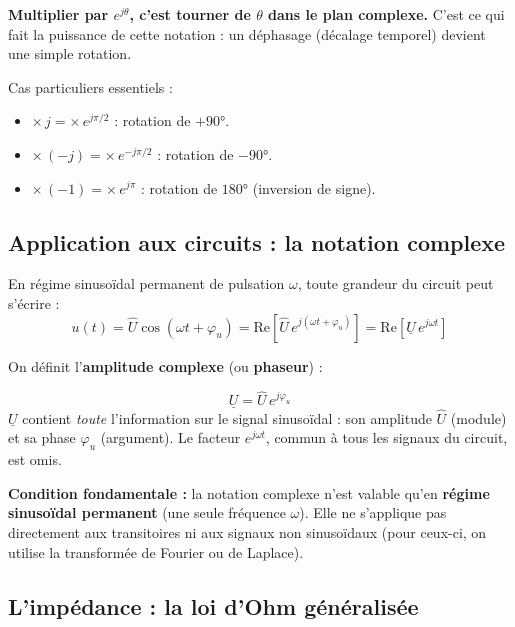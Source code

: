 \documentclass[12pt,a4paper,twoside]{book}
\begin{document}
\begin{intuition}
\textbf{Multiplier par $e^{j\theta}$, c'est tourner de $\theta$ dans le plan complexe.} C'est ce qui fait la puissance de cette notation : un déphasage (décalage temporel) devient une simple rotation.

Cas particuliers essentiels :
\begin{itemize}[nosep]
\item $\times\, j = \times\, e^{j\pi/2}$ : rotation de $+90°$.
\item $\times\, (-j) = \times\, e^{-j\pi/2}$ : rotation de $-90°$.
\item $\times\, (-1) = \times\, e^{j\pi}$ : rotation de $180°$ (inversion de signe).
\end{itemize}
\end{intuition}

\subsection{Application aux circuits : la notation complexe}

En régime sinusoïdal permanent de pulsation $\omega$, toute grandeur du circuit peut s'écrire :
\[
u(t) = \hat{U}\cos(\omega t + \varphi_u) = \text{Re}\left[\hat{U}\,e^{j(\omega t + \varphi_u)}\right] = \text{Re}\left[\underline{U}\,e^{j\omega t}\right]
\]

On définit l'\textbf{amplitude complexe} (ou \textbf{phaseur}) :

\begin{formule}
\[
\boxed{\underline{U} = \hat{U}\,e^{j\varphi_u}}
\]
$\underline{U}$ contient \textit{toute} l'information sur le signal sinusoïdal : son amplitude $\hat{U}$ (module) et sa phase $\varphi_u$ (argument). Le facteur $e^{j\omega t}$, commun à tous les signaux du circuit, est omis.
\end{formule}

\begin{attention}
\textbf{Condition fondamentale :} la notation complexe n'est valable qu'en \textbf{régime sinusoïdal permanent} (une seule fréquence $\omega$). Elle ne s'applique pas directement aux transitoires ni aux signaux non sinusoïdaux (pour ceux-ci, on utilise la transformée de Fourier ou de Laplace).
\end{attention}

\subsection{L'impédance : la loi d'Ohm généralisée}
\end{document}
